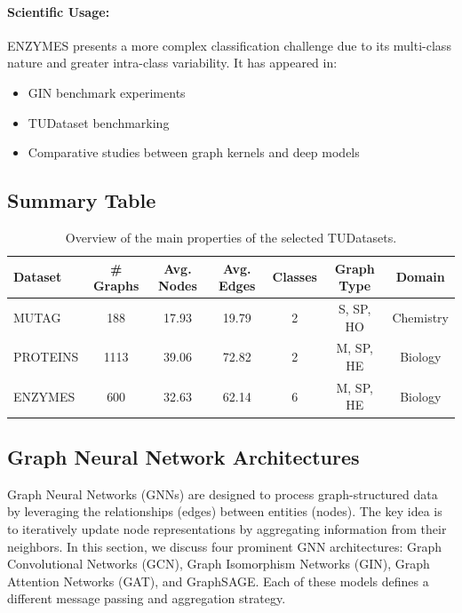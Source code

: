 \documentclass[11pt,a4paper]{article}
\begin{document}
\paragraph{Scientific Usage:}
ENZYMES presents a more complex classification challenge due to its multi-class nature and greater intra-class variability. It has appeared in:
\begin{itemize}
	\item GIN benchmark experiments \cite{xu2019powerful}
	\item TUDataset benchmarking \cite{morris2020tudataset}
	\item Comparative studies between graph kernels and deep models \cite{yanardag2015deep}
\end{itemize}
	
	\subsection{Summary Table}
	
	\begin{table}[h]
		\centering
		\begin{tabular}{lcccccc}
			\toprule
			\textbf{Dataset} & \textbf{\# Graphs} & \textbf{Avg. Nodes} & \textbf{Avg. Edges} & \textbf{Classes} & \textbf{Graph Type}\footnotemark & \textbf{Domain} \\
			\midrule
			MUTAG    & 188  & 17.93 & 19.79 & 2 & S, SP, HO & Chemistry \\
			PROTEINS & 1113 & 39.06 & 72.82 & 2 & M, SP, HE & Biology \\
			ENZYMES  & 600  & 32.63 & 62.14 & 6 & M, SP, HE & Biology \\
			\bottomrule
		\end{tabular}
		\caption{Overview of the main properties of the selected TUDatasets. 
		}
	\end{table}

	\subsection{Graph Neural Network Architectures}
	
	Graph Neural Networks (GNNs) are designed to process graph-structured data by leveraging the relationships (edges) between entities (nodes). The key idea is to iteratively update node representations by aggregating information from their neighbors. In this section, we discuss four prominent GNN architectures: Graph Convolutional Networks (GCN), Graph Isomorphism Networks (GIN), Graph Attention Networks (GAT), and GraphSAGE. Each of these models defines a different message passing and aggregation strategy.
	
\end{document}
